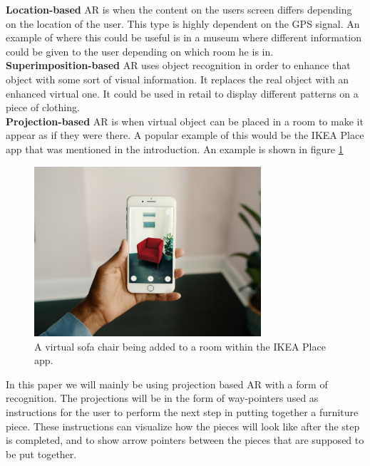 \textbf{Location-based} AR is when the content on the users screen differs depending on the location of the user. This type is highly dependent on the GPS signal.
An example of where this could be useful is in a museum where different information could be given to the user depending on which room he is in.\\

\textbf{Superimposition-based} AR uses object recognition in order to enhance that object with some sort of visual information. It replaces the real object with an enhanced virtual one. It could be used in retail to display different patterns on a piece of clothing.\\

\textbf{Projection-based} AR is when virtual object can be placed in a room to make it appear as if they were there. A popular example of this would be the IKEA Place app that was mentioned in the introduction. An example is shown in figure \ref{fig:projection-based-ar} \\

\begin{figure}[hbtp]
\begin{center}
\includegraphics[width = 0.75\textwidth]{./Images/ikeaplace.jpg} 
\caption{A virtual sofa chair being added to a room within the IKEA Place app.}
\label{fig:projection-based-ar}
\end{center}
\end{figure}

In this paper we will mainly be using projection based AR with a form of recognition. The projections will be in the form of way-pointers used as instructions for the user to perform the next step in putting together a furniture piece. These instructions can visualize how the pieces will look like after the step is completed, and to show arrow pointers between the pieces that are supposed to be put together.

